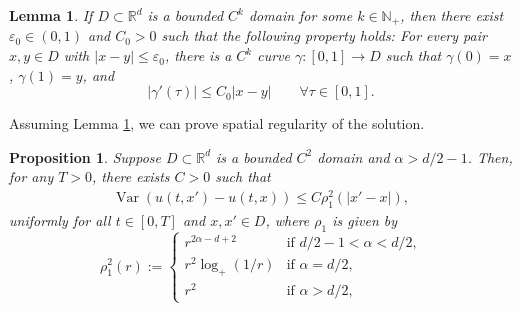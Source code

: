 \documentclass[reqno]{amsart}
\DeclareMathOperator{\Var}{Var}
\newcommand{\R}{\mathbb R}
\newcommand{\N}{\mathbb N}
\newcommand{\1}{\mathbf 1}
\numberwithin{equation}{section}
\newtheorem{proposition}[theorem]{Proposition}
\newtheorem{lemma}[theorem]{Lemma}
\theoremstyle{definition}
\begin{document}
\begin{lemma}\label{lem:curve}
If $D\subset \R^d$ is a bounded $C^k$ domain for some $k \in \N_+$, then there exist $\varepsilon_0 \in (0,1)$ and $C_0>0$ such that the following property holds: For every pair $x,y \in D$ with $|x-y|\le \varepsilon_0$, there is a $C^k$ curve $\gamma:[0,1] \to D$ such that $\gamma(0)=x$, $\gamma(1)=y$, and
\[
	|\gamma'(\tau)| \le C_0|x-y| \qquad \forall \tau \in [0,1].
\]
\end{lemma}

Assuming Lemma \ref{lem:curve}, we can prove spatial regularity of the solution.

\begin{proposition}\label{prop:u-u:x}
Suppose $D \subset \R^d$ is a bounded $C^2$ domain and $\alpha>d/2-1$.
Then, for any $T>0$, there exists $C>0$ such that
\begin{align}\label{var:u-u:x}
	\Var(u(t,x')-u(t,x)) \le C \rho_1^2(|x'-x|),
\end{align}
uniformly for all $t \in [0,T]$ and $x,x'\in D$, where $\rho_1$ is given by
\[
	\rho_1^2(r) :=\begin{cases}
	r^{2\alpha-d+2} & \text{if $d/2-1<\alpha<d/2$,}\\
	r^2 \log_+(1/r) & \text{if $\alpha=d/2$,}\\
	r^2 & \text{if $\alpha>d/2$,}
	\end{cases}
\]
\end{proposition}
\end{document}
